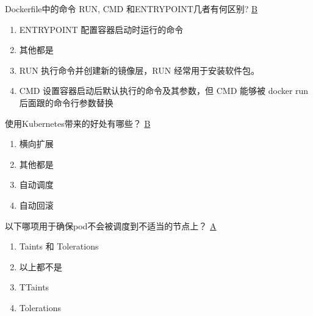 \begin{problem}
	Dockerfile中的命令 RUN, CMD 和ENTRYPOINT几者有何区别?
	\uline{B}    
        \begin{enumerate}[label=\Alph*.]
            \item ENTRYPOINT 配置容器启动时运行的命令
            \item 其他都是
            \item RUN 执行命令并创建新的镜像层，RUN 经常用于安装软件包。
            \item CMD 设置容器启动后默认执行的命令及其参数，但 CMD 能够被 docker run 后面跟的命令行参数替换
        \end{enumerate}
\end{problem}



\begin{problem}
	使用Kubernetes带来的好处有哪些？
	\uline{B}    
    \vspace{-0.8em}
    \begin{multicols}{4}
        \begin{enumerate}[label=\Alph*.]
            \item 横向扩展
            \item 其他都是
            \item 自动调度
            \item 自动回滚
        \end{enumerate}
    \end{multicols}
    \vspace{-1em}
\end{problem}



\begin{problem}
	以下哪项用于确保pod不会被调度到不适当的节点上？
	\uline{A}    
    \vspace{-0.8em}
    \begin{multicols}{2}
        \begin{enumerate}[label=\Alph*.]
            \item Taints 和 Tolerations
            \item 以上都不是
            \item TTaints
            \item Tolerations
        \end{enumerate}
    \end{multicols}
    \vspace{-1em}
\end{problem}



